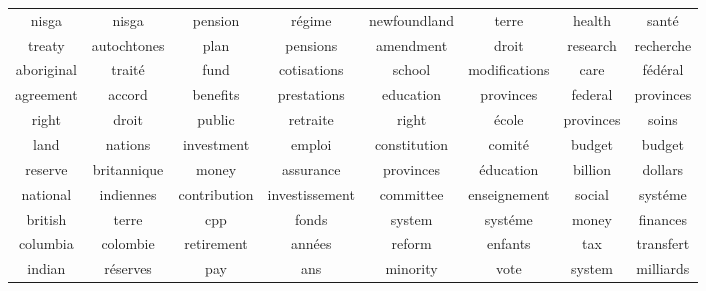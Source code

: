 \documentclass{article}
\begin{document}
\begin{table*}[h!] 
\centering 
\begin{tabular}{cc|cc|cc|cc} 
                nisga &                nisga &               pension &              r\'egime &          newfoundland &                terre &                health &               sant\'e \\ 
                treaty &          autochtones &                  plan &             pensions &             amendment &                droit &              research &            recherche  \\ 
            aboriginal &              trait\'e &                  fund &          cotisations &                school &        modifications &                  care &            f\'ed\'eral  \\ 
             agreement &               accord &              benefits &          prestations &             education &            provinces &               federal &            provinces  \\ 
                 right &                droit &                public &             retraite &                 right &               \'ecole &             provinces &                soins  \\ 
                  land &              nations &            investment &               emploi &          constitution &              comit\'e &                budget &               budget  \\ 
               reserve &          britannique &                 money &            assurance &             provinces &           \'education &               billion &              dollars  \\ 
              national &            indiennes &          contribution &       investissement &             committee &         enseignement &                social &             syst\'eme  \\ 
               british &                terre &                   cpp &                fonds &                system &             syst\'eme &                 money &             finances  \\ 
              columbia &             colombie &            retirement &              ann\'ees &                reform &              enfants &                   tax &            transfert  \\ 
                indian &            r\'eserves &                   pay &                  ans &              minority &                 vote &                system &            milliards  \\ 

\end{tabular}
\end{table*}
\end{document}

